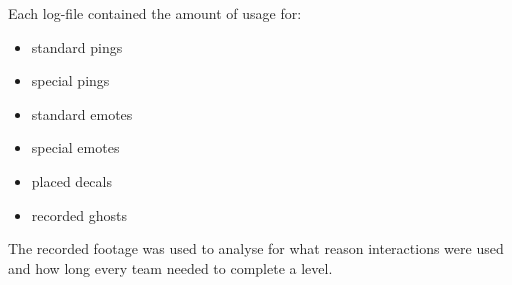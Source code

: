 Each log-file contained the amount of usage for:
\begin{itemize}
    \item standard pings
    \item special pings
    \item standard emotes
    \item special emotes
    \item placed decals
    \item recorded ghosts
\end{itemize}

The recorded footage was used to analyse for what reason interactions were used and how long every team needed to complete a level.